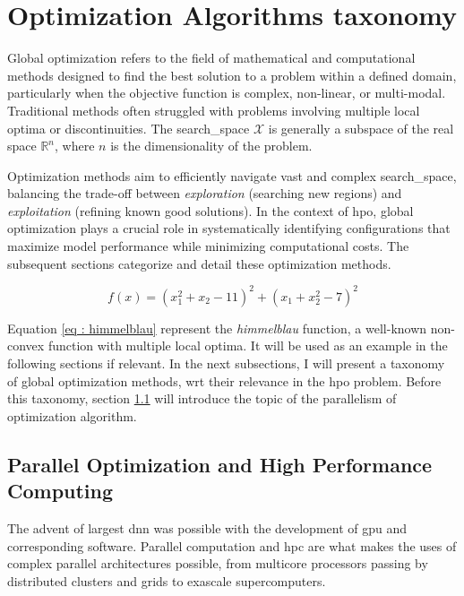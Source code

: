 \section{Optimization Algorithms taxonomy}
\label{sec : opt_algo}

Global optimization refers to the field of mathematical and computational methods designed to find the best solution to a problem within a defined domain, particularly when the objective function is complex, non-linear, or multi-modal. Traditional methods often struggled with problems involving multiple local optima or discontinuities. The \gls{search_space} $\mathcal X$ is generally a subspace of the real space $\mathbb{R}^n$, where $n$ is the dimensionality of the problem.

Optimization methods aim to efficiently navigate vast and complex \gls{search_space}, balancing the trade-off between \textit{exploration} (searching new regions) and \textit{exploitation} (refining known good solutions). In the context of \acrfull{hpo}, global optimization plays a crucial role in systematically identifying configurations that maximize model performance while minimizing computational costs. The subsequent sections categorize and detail these optimization methods. 

\begin{equation}
    f(x) = (x_1^2 + x_2 - 11)^2 + (x_1 + x_2^2 - 7)^2
    \label{eq : himmelblau}
\end{equation}

Equation \ref{eq : himmelblau} represent the \textit{\gls{himmelblau}} function, a well-known non-convex function with multiple local optima. It will be used as an example in the following sections if relevant. In the next subsections, I will present a taxonomy of global optimization methods, \acrshort{wrt} their relevance in the \acrshort{hpo} problem. Before this taxonomy, section \ref{sec:hpc} will introduce the topic of the parallelism of optimization algorithm.



\subsection{Parallel Optimization and High Performance Computing}
\label{sec:hpc}
The advent of largest \acrshort{dnn} was possible with the development of \acrfull{gpu} and corresponding software. Parallel computation and \acrfull{hpc} are what makes the uses of complex parallel architectures possible, from multicore processors passing by distributed clusters and grids to \Gls{exascale} supercomputers.

